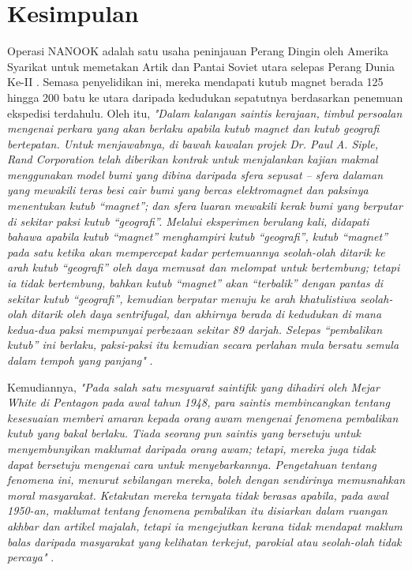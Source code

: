 \documentclass[10pt,twocolumn,letterpaper]{article}
\begin{document}
\section{Kesimpulan}

Operasi NANOOK adalah satu usaha peninjauan Perang Dingin oleh Amerika Syarikat untuk memetakan Artik dan Pantai Soviet utara selepas Perang Dunia Ke-II \cite{137}. Semasa penyelidikan ini, mereka mendapati kutub magnet berada 125 hingga 200 batu ke utara daripada kedudukan sepatutnya berdasarkan penemuan ekspedisi terdahulu. Oleh itu, \textit{"Dalam kalangan saintis kerajaan, timbul persoalan mengenai perkara yang akan berlaku apabila kutub magnet dan kutub geografi bertepatan. Untuk menjawabnya, di bawah kawalan projek Dr. Paul A. Siple, Rand Corporation telah diberikan kontrak untuk menjalankan kajian makmal menggunakan model bumi yang dibina daripada sfera sepusat – sfera dalaman yang mewakili teras besi cair bumi yang bercas elektromagnet dan paksinya menentukan kutub “magnet”; dan sfera luaran mewakili kerak bumi yang berputar di sekitar paksi kutub “geografi”. Melalui eksperimen berulang kali, didapati bahawa apabila kutub “magnet” menghampiri kutub “geografi”, kutub “magnet” pada satu ketika akan mempercepat kadar pertemuannya seolah-olah ditarik ke arah kutub “geografi” oleh daya memusat dan melompat untuk bertembung; tetapi ia tidak bertembung, bahkan kutub “magnet” akan “terbalik” dengan pantas di sekitar kutub “geografi”, kemudian berputar menuju ke arah khatulistiwa seolah-olah ditarik oleh daya sentrifugal, dan akhirnya berada di kedudukan di mana kedua-dua paksi mempunyai perbezaan sekitar 89 darjah. Selepas “pembalikan kutub” ini berlaku, paksi-paksi itu kemudian secara perlahan mula bersatu semula dalam tempoh yang panjang"} \cite{138,139}.

Kemudiannya, \textit{"Pada salah satu mesyuarat saintifik yang dihadiri oleh Mejar White di Pentagon pada awal tahun 1948, para saintis membincangkan tentang kesesuaian memberi amaran kepada orang awam mengenai fenomena pembalikan kutub yang bakal berlaku. Tiada seorang pun saintis yang bersetuju untuk menyembunyikan maklumat daripada orang awam; tetapi, mereka juga tidak dapat bersetuju mengenai cara untuk menyebarkannya. Pengetahuan tentang fenomena ini, menurut sebilangan mereka, boleh dengan sendirinya memusnahkan moral masyarakat. Ketakutan mereka ternyata tidak berasas apabila, pada awal 1950-an, maklumat tentang fenomena pembalikan itu disiarkan dalam ruangan akhbar dan artikel majalah, tetapi ia mengejutkan kerana tidak mendapat maklum balas daripada masyarakat yang kelihatan terkejut, parokial atau seolah-olah tidak percaya"} \cite{138,139}.
\end{document}
